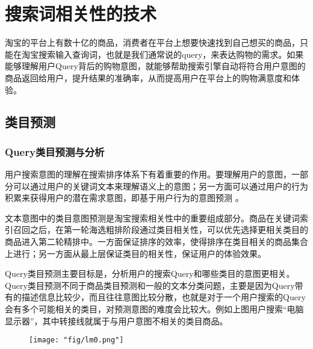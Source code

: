 
\chapter{搜索词相关性的技术}
\thispagestyle{empty}

\setlength{\fboxrule}{0pt}\setlength{\fboxsep}{0cm}
\noindent\shadowbox{
\begin{tcolorbox}[arc=0mm,colback=lightblue,colframe=darkblue,title=学习目标与要求]

\end{tcolorbox}}
\setlength{\fboxrule}{1pt}\setlength{\fboxsep}{4pt} 

淘宝的平台上有数十亿的商品，消费者在平台上想要快速找到自己想买的商品，只能在淘宝搜索输入查询词，也就是我们通常说的query，来表达购物的需求。如果能够理解用户Query背后的购物意图，就能够帮助搜索引擎自动将符合用户意图的商品返回给用户，提升结果的准确率，从而提高用户在平台上的购物满意度和体验。



\section{类目预测}
\subsection{Query类目预测与分析}
用户搜索意图的理解在搜索排序体系下有着重要的作用。要理解用户的意图，一部分可以通过用户的关键词文本来理解语义上的意图；另一方面可以通过用户的行为积累来获得用户的潜在需求意图，即基于用户行为的意图预测 。
\par 文本意图中的类目意图预测是淘宝搜索相关性中的重要组成部分。商品在关键词索引召回之后，在第一轮海选粗排阶段通过类目相关性，可以优先选择更相关类目的商品进入第二轮精排中。一方面保证排序的效率，使得排序在类目相关的商品集合上进行；另一方面从最上层保证类目的相关性，保证用户的体验效果。
\par Query类目预测主要目标是，分析用户的搜索Query和哪些类目的意图更相关。Query类目预测不同于商品类目预测和一般的文本分类问题，主要是因为Query带有的描述信息比较少，而且往往意图比较分散，也就是对于一个用户搜索的Query会有多个可能相关的类目，对预测意图的难度会比较大。例如上图用户搜索“电脑显示器”，其中转接线就属于与用户意图不相关的类目商品。 
\begin{figure}[!h]
	\centering
	\texttt{[image: "fig/lm0.png"]}
	\caption{}
	\label{fig:lm0}
\end{figure}

